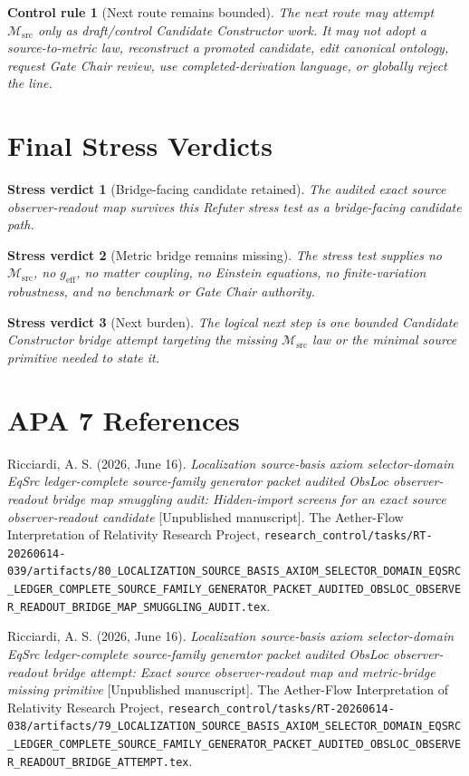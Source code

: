 \documentclass[11pt]{article}
\newcommand{\Msrc}{\mathcal{M}_{\mathrm{src}}}
\newcommand{\geff}{g_{\mathrm{eff}}}
\newtheorem{controlrule}{Control rule}
\newtheorem{verdict}{Stress verdict}
\begin{document}
\begin{controlrule}[Next route remains bounded]
The next route may attempt \(\Msrc\) only as draft/control Candidate
Constructor work. It may not adopt a source-to-metric law, reconstruct
a promoted candidate, edit canonical ontology, request Gate Chair
review, use completed-derivation language, or globally reject the
line.
\end{controlrule}

\section{Final Stress Verdicts}

\begin{verdict}[Bridge-facing candidate retained]
The audited exact source observer-readout map survives this Refuter
stress test as a bridge-facing candidate path.
\end{verdict}

\begin{verdict}[Metric bridge remains missing]
The stress test supplies no \(\Msrc\), no \(\geff\), no matter
coupling, no Einstein equations, no finite-variation robustness, and
no benchmark or Gate Chair authority.
\end{verdict}

\begin{verdict}[Next burden]
The logical next step is one bounded Candidate Constructor bridge
attempt targeting the missing \(\Msrc\) law or the minimal source
primitive needed to state it.
\end{verdict}

\section*{APA 7 References}

Ricciardi, A. S. (2026, June 16). \emph{Localization source-basis
axiom selector-domain EqSrc ledger-complete source-family generator
packet audited ObsLoc observer-readout bridge map smuggling audit:
Hidden-import screens for an exact source observer-readout candidate}
[Unpublished manuscript]. The Aether-Flow Interpretation of
Relativity Research Project,
\texttt{research\_control/tasks/RT-20260614-039/artifacts/80\_LOCALIZATION\_SOURCE\_BASIS\_AXIOM\_SELECTOR\_DOMAIN\_EQSRC\_LEDGER\_COMPLETE\_SOURCE\_FAMILY\_GENERATOR\_PACKET\_AUDITED\_OBSLOC\_OBSERVER\_READOUT\_BRIDGE\_MAP\_SMUGGLING\_AUDIT.tex}.

Ricciardi, A. S. (2026, June 16). \emph{Localization source-basis
axiom selector-domain EqSrc ledger-complete source-family generator
packet audited ObsLoc observer-readout bridge attempt: Exact source
observer-readout map and metric-bridge missing primitive}
[Unpublished manuscript]. The Aether-Flow Interpretation of
Relativity Research Project,
\texttt{research\_control/tasks/RT-20260614-038/artifacts/79\_LOCALIZATION\_SOURCE\_BASIS\_AXIOM\_SELECTOR\_DOMAIN\_EQSRC\_LEDGER\_COMPLETE\_SOURCE\_FAMILY\_GENERATOR\_PACKET\_AUDITED\_OBSLOC\_OBSERVER\_READOUT\_BRIDGE\_ATTEMPT.tex}.
\end{document}
